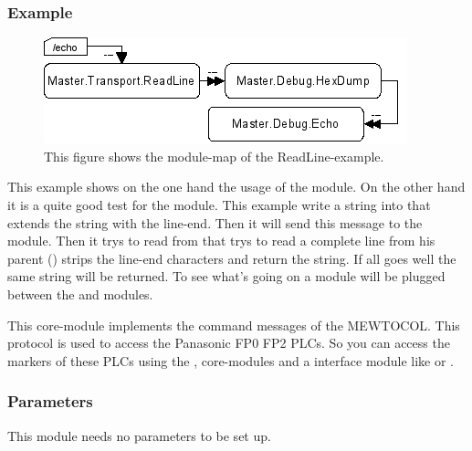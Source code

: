 \subsubsection{Example}
\begin{figure}[ht]
    \label{fig:coremod10}
    \centering
    \includegraphics{coremod10.png}
    \caption{This figure shows the module-map of the ReadLine-example.}
\end{figure}    
This example shows on the one hand the usage of the  module.
On the other hand it is a quite good test for the  module. 
This example write a string into  that extends the string 
with the line-end. Then it will send this message to the  module.
Then it trys to read from  that trys to read a complete 
line from his parent () strips the line-end characters and
return the string. If all goes well the same string will be returned. To see
what's going on a  module will be plugged between the 
 and  modules.




%
%



%
%



%
%



%
%
This core-module implements the command messages of the MEWTOCOL. This 
protocol is used to access the Panasonic FP0 FP2 PLCs. So you can access
the markers of these PLCs using the ,
 core-modules and a interface module like 
 or .

\subsubsection{Parameters}
This module needs no parameters to be set up.

